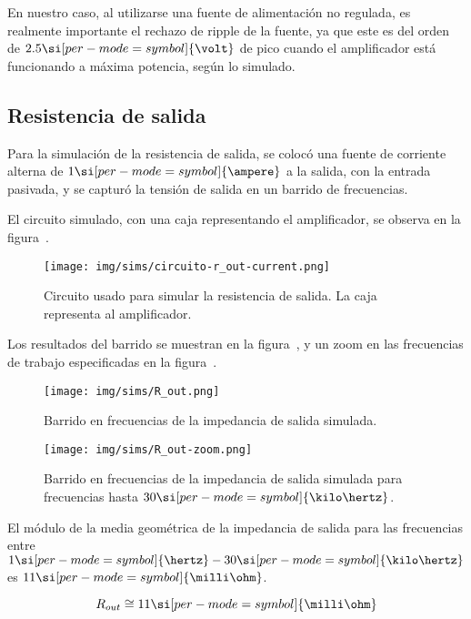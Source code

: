 En nuestro caso, al utilizarse una fuente de alimentación no regulada, es realmente importante el rechazo de ripple de la fuente, ya que este es del orden de $2.5 \si[per-mode=symbol]{\volt}$ de pico cuando el amplificador está funcionando a máxima potencia, según lo simulado.

\subsection{Resistencia de salida}  

Para la simulación de la resistencia de salida, se colocó una fuente de corriente alterna de $1 \si[per-mode=symbol]{\ampere}$ a la salida, con la entrada pasivada, y se capturó la tensión de salida en un barrido de frecuencias.


El circuito simulado, con una caja representando el amplificador, se observa en la figura~.


\begin{figure}[H]
	\centering
	\texttt{[image: img/sims/circuito-r\_out-current.png]}
	\caption{Circuito usado para simular la resistencia de salida. La caja representa al amplificador.}
	\label{fig:circuito_r-out-current}
\end{figure}

Los resultados del barrido se muestran en la figura~, y un zoom en las frecuencias de trabajo especificadas en la figura~.

\begin{figure}[H]
	\centering
	\texttt{[image: img/sims/R\_out.png]}
	\caption{Barrido en frecuencias de la impedancia de salida simulada.}
	\label{fig:R_out}
\end{figure}

\begin{figure}[H]
	\centering
	\texttt{[image: img/sims/R\_out-zoom.png]}
	\caption{Barrido en frecuencias de la impedancia de salida simulada para frecuencias hasta $30 \si[per-mode=symbol]{\kilo\hertz}$.}
	\label{fig:R_out-zoom}
\end{figure}

El módulo de la media geométrica de la impedancia de salida para las frecuencias entre $1 \si[per-mode=symbol]{\hertz}-30 \si[per-mode=symbol]{\kilo\hertz}$ es $11 \si[per-mode=symbol]{\milli\ohm}$.

\[ R_{out}\cong 11 \si[per-mode=symbol]{\milli\ohm}\]

